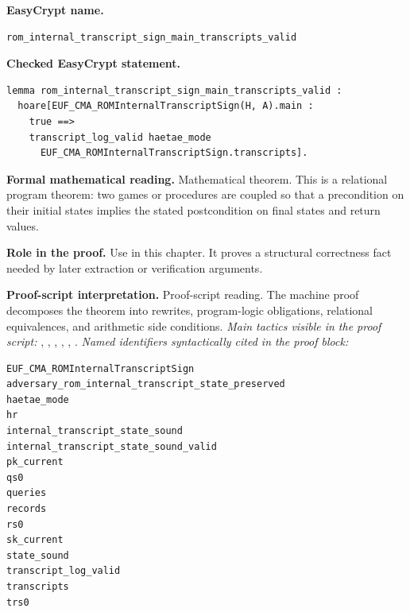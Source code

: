 \begin{formaltheorem}
\noindent\textbf{EasyCrypt name.}
\begin{lstlisting}[language=EasyCrypt,basicstyle=\ttfamily\scriptsize]
rom_internal_transcript_sign_main_transcripts_valid
\end{lstlisting}
\noindent\textbf{Checked EasyCrypt statement.}
\begin{lstlisting}[language=EasyCrypt,basicstyle=\ttfamily\scriptsize]
lemma rom_internal_transcript_sign_main_transcripts_valid :
  hoare[EUF_CMA_ROMInternalTranscriptSign(H, A).main :
    true ==>
    transcript_log_valid haetae_mode
      EUF_CMA_ROMInternalTranscriptSign.transcripts].
\end{lstlisting}
\noindent\textbf{Formal mathematical reading.}
Mathematical theorem. This is a relational program theorem: two games or procedures are coupled so that a precondition on their initial states implies the stated postcondition on final states and return values.

\noindent\textbf{Role in the proof.}
Use in this chapter. It proves a structural correctness fact needed by later extraction or verification arguments.

\noindent\textbf{Proof-script interpretation.}
Proof-script reading. The machine proof decomposes the theorem into rewrites, program-logic obligations, relational equivalences, and arithmetic side conditions.
\emph{Main tactics visible in the proof script:} , , , , , .
\emph{Named identifiers syntactically cited in the proof block:}
\begin{lstlisting}[language=EasyCrypt,basicstyle=\ttfamily\scriptsize]
EUF_CMA_ROMInternalTranscriptSign
adversary_rom_internal_transcript_state_preserved
haetae_mode
hr
internal_transcript_state_sound
internal_transcript_state_sound_valid
pk_current
qs0
queries
records
rs0
sk_current
state_sound
transcript_log_valid
transcripts
trs0
\end{lstlisting}

\end{formaltheorem}

